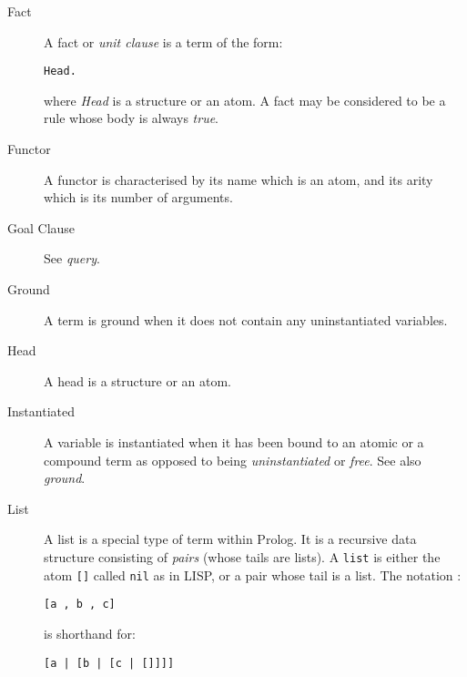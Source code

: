 \begin{description}
\item[Fact]
A fact or {\it unit clause} is a term of the form:
\begin{verbatim}
Head.
\end{verbatim}
where {\it Head} is a structure or an atom.
A fact may be considered to be a rule whose body is always {\it true}.

\item[Functor]
A functor is characterised by its name which is an atom, and its arity
which is its number of arguments.

\item[Goal Clause]
See {\it query}.

\item[Ground]
A term is ground when it does not contain any uninstantiated variables.

\item[Head]
A head is a structure or an atom.

\item[Instantiated]
A variable is instantiated when it has been bound to an atomic or a 
compound term as opposed to 
being {\it uninstantiated} or {\it free}.  See also {\it ground}. 



\item[List]
A list is a special type of term within Prolog. It is a 
recursive data structure consisting of {\it pairs} (whose tails are lists).
A {\tt list} is either the atom {\tt []} called {\tt nil} as in LISP,
or a pair whose tail is a list.
The notation :
\begin{verbatim}
[a , b , c]
\end{verbatim}
is shorthand for:
\begin{verbatim}
[a | [b | [c | []]]]
\end{verbatim}
\index{[]}



\end{description}
